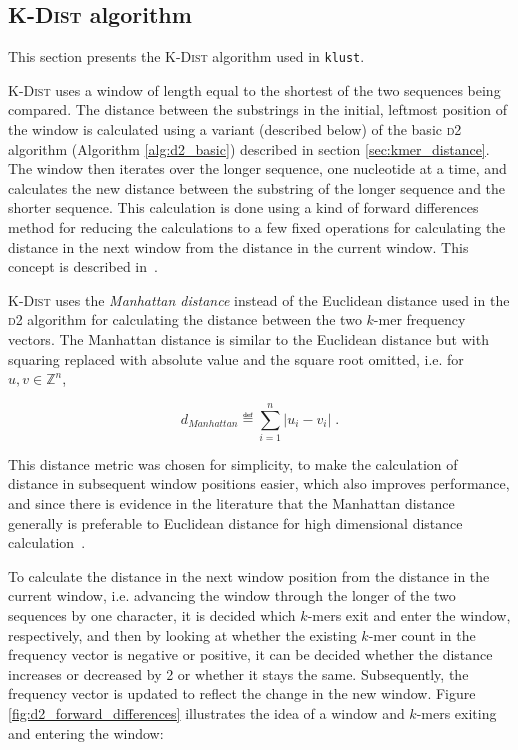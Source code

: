 \subsection{\textsc{K-Dist} algorithm}

This section presents the \textsc{K-Dist} algorithm used in \texttt{klust}.

\textsc{K-Dist} uses a window of length equal to the shortest of the two
sequences being compared. The distance between the substrings in the initial,
leftmost position of the window is calculated using a variant (described below)
of the basic \textsc{d2} algorithm (Algorithm \ref{alg:d2_basic}) described in
section \ref{sec:kmer_distance}. The window then iterates over the longer
sequence, one nucleotide at a time, and calculates the new distance between the
substring of the longer sequence and the shorter sequence.  This calculation is
done using a kind of forward differences method for reducing the calculations
to a few fixed operations for calculating the distance in the next window from
the distance in the current window. This concept is described
in~\cite{hazelhurst}.

\textsc{K-Dist} uses the \emph{Manhattan distance} instead of the Euclidean
distance used in the \textsc{d2} algorithm for calculating the distance between
the two $k$-mer frequency vectors. The Manhattan distance is similar to the
Euclidean distance but with squaring replaced with absolute value and the
square root omitted, i.e.  for $u, v \in \mathbb{Z}^n$,

\begin{equation}
  d_{Manhattan} \eqdef \sum_{i=1}^{n} |u_i - v_i| \;.
\end{equation}

This distance metric was chosen for simplicity, to make the calculation of
distance in subsequent window positions easier, which also improves
performance, and since there is evidence in the literature that the Manhattan
distance generally is preferable to Euclidean distance for high dimensional
distance calculation~\cite{aggarwal}.  %

To calculate the distance in the next window position from the distance in the
current window, i.e. advancing the window through the longer of the two
sequences by one character, it is decided which $k$-mers exit and enter the
window, respectively, and then by looking at whether the existing $k$-mer count
in the frequency vector is negative or positive, it can be decided whether the
distance increases or decreased by 2 or whether it stays the same.
Subsequently, the frequency vector is updated to reflect the change in the new
window. Figure \ref{fig:d2_forward_differences} illustrates the idea of a
window and $k$-mers exiting and entering the window:

